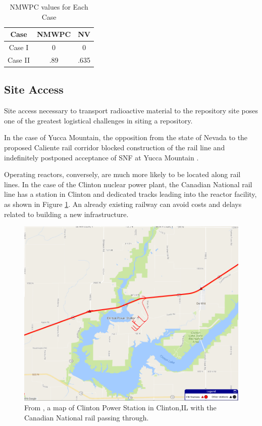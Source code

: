 \begin{table}[h]
	
	\centering
	\caption {\gls{NMWPC} values for Each Case}

		\begin{tabular}{|c|c|c|}
			\hline
			Case & NMWPC & NV \\
			\hline
			Case I & 0 & 0\\
			Case II & .89 & .635\\
					\hline
                \end{tabular}
\end{table}


\subsection{Site Access}

Site access necessary to transport radioactive material to the repository site 
poses one of the greatest logistical challenges in siting a repository. 

In the case of Yucca Mountain, 
the opposition from the state of Nevada to the proposed Caliente rail corridor 
blocked construction of the rail line and indefinitely postponed
acceptance of \gls{SNF} at Yucca Mountain \cite{halstead_yucca_2011}.

Operating reactors, conversely, are much more likely to be located along rail 
lines. In the case of the Clinton nuclear power plant, 
the Canadian National rail line \cite{waleed_regional_2015} has a station in 
Clinton and dedicated tracks leading into the reactor facility, as shown in 
Figure \ref{fig:cnmap}. An already existing railway can avoid costs and delays related
 to building a new infrastructure.

\begin{figure}[!h] 
  \centering
  \includegraphics[width=0.8\columnwidth]{cnmap.png}	
        \caption{From \cite{canadian_national_railway_company_canadian_2016}, a map of Clinton Power Station in Clinton,IL
        with the Canadian National rail passing through.}
  \label{fig:cnmap}
\end{figure}

